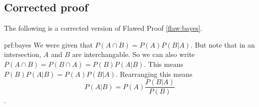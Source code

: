 \clearpage
\subsection{Corrected proof}

The following is a corrected version of Flawed Proof \ref{flaw:bayes}. %

\begin{prf}{prf:bayes} %
We were given that $P(A\cap B) = P(A)P(B|A)$. But note that in an intersection, $A$ and $B$ are interchangable. So we can also write $P(A\cap B) = P(B\cap A) = P(B)P(A|B)$. This means $P(B)P(A|B) = P(A)P(B|A)$. Rearranging this means 
$$P(A|B) = P(A)\frac{P(B|A)}{P(B)}$$. 
\end{prf}